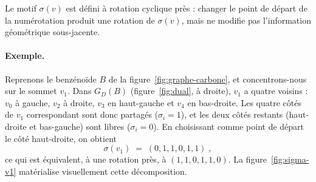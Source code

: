 \documentclass[11pt,a4paper]{article}
\newcommand{\GD}{\ensuremath{G_D}}                 %
\begin{document}
Le motif $\sigma(v)$ est défini à rotation cyclique près : changer
le point de départ de la numérotation produit une rotation de
$\sigma(v)$, mais ne modifie pas l'information géométrique sous-jacente.

\paragraph{Exemple.} Reprenons le benzénoïde $B$ de la
figure~\ref{fig:graphe-carbone}, et concentrons-nous sur le sommet
$v_1$. Dans $\GD(B)$ (figure~\ref{fig:dual}, à droite), $v_1$ a quatre
voisins : $v_0$ à gauche, $v_2$ à droite, $v_3$ en haut-gauche et
$v_4$ en bas-droite. Les quatre côtés de $v_1$ correspondant sont donc
partagés ($\sigma_i = 1$), et les deux côtés restants
(haut-droite et bas-gauche) sont libres ($\sigma_i = 0$). En
choisissant comme point de départ le côté haut-droite, on obtient
\[
  \boxed{\;\sigma(v_1) \;=\; (0, 1, 1, 0, 1, 1) \;,\;}
\]
ce qui est équivalent, à une rotation près, à $(1, 1, 0, 1, 1, 0)$.
La figure~\ref{fig:sigma-v1} matérialise visuellement cette
décomposition.
\end{document}
